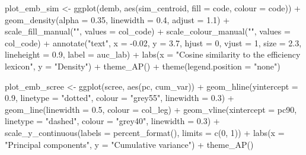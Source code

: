 \documentclass[
  11pt,
]{article}
\newenvironment{Shaded}{\begin{snugshade}}{\end{snugshade}}
\newcommand{\AttributeTok}[1]{\textcolor[rgb]{0.77,0.63,0.00}{#1}}
\newcommand{\DecValTok}[1]{\textcolor[rgb]{0.00,0.00,0.81}{#1}}
\newcommand{\FloatTok}[1]{\textcolor[rgb]{0.00,0.00,0.81}{#1}}
\newcommand{\FunctionTok}[1]{\textcolor[rgb]{0.00,0.00,0.00}{#1}}
\newcommand{\NormalTok}[1]{#1}
\newcommand{\OtherTok}[1]{\textcolor[rgb]{0.56,0.35,0.01}{#1}}
\newcommand{\SpecialCharTok}[1]{\textcolor[rgb]{0.00,0.00,0.00}{#1}}
\newcommand{\StringTok}[1]{\textcolor[rgb]{0.31,0.60,0.02}{#1}}
\begin{document}
\begin{Shaded}
\begin{Highlighting}[]
\NormalTok{plot\_emb\_sim }\OtherTok{\textless{}{-}} \FunctionTok{ggplot}\NormalTok{(demb, }\FunctionTok{aes}\NormalTok{(sim\_centroid, }\AttributeTok{fill =}\NormalTok{ code, }\AttributeTok{colour =}\NormalTok{ code)) }\SpecialCharTok{+}
  \FunctionTok{geom\_density}\NormalTok{(}\AttributeTok{alpha =} \FloatTok{0.35}\NormalTok{, }\AttributeTok{linewidth =} \FloatTok{0.4}\NormalTok{, }\AttributeTok{adjust =} \FloatTok{1.1}\NormalTok{) }\SpecialCharTok{+}
  \FunctionTok{scale\_fill\_manual}\NormalTok{(}\StringTok{""}\NormalTok{, }\AttributeTok{values =}\NormalTok{ col\_code) }\SpecialCharTok{+}
  \FunctionTok{scale\_colour\_manual}\NormalTok{(}\StringTok{""}\NormalTok{, }\AttributeTok{values =}\NormalTok{ col\_code) }\SpecialCharTok{+}
  \FunctionTok{annotate}\NormalTok{(}\StringTok{"text"}\NormalTok{, }\AttributeTok{x =} \SpecialCharTok{{-}}\FloatTok{0.02}\NormalTok{, }\AttributeTok{y =} \FloatTok{3.7}\NormalTok{, }\AttributeTok{hjust =} \DecValTok{0}\NormalTok{, }\AttributeTok{vjust =} \DecValTok{1}\NormalTok{, }\AttributeTok{size =} \FloatTok{2.3}\NormalTok{,}
           \AttributeTok{lineheight =} \FloatTok{0.9}\NormalTok{, }\AttributeTok{label =}\NormalTok{ auc\_lab) }\SpecialCharTok{+}
  \FunctionTok{labs}\NormalTok{(}\AttributeTok{x =} \StringTok{"Cosine similarity to the efficiency lexicon"}\NormalTok{, }\AttributeTok{y =} \StringTok{"Density"}\NormalTok{) }\SpecialCharTok{+}
  \FunctionTok{theme\_AP}\NormalTok{() }\SpecialCharTok{+}
  \FunctionTok{theme}\NormalTok{(}\AttributeTok{legend.position =} \StringTok{"none"}\NormalTok{)}

\NormalTok{plot\_emb\_scree }\OtherTok{\textless{}{-}} \FunctionTok{ggplot}\NormalTok{(scree, }\FunctionTok{aes}\NormalTok{(pc, cum\_var)) }\SpecialCharTok{+}
  \FunctionTok{geom\_hline}\NormalTok{(}\AttributeTok{yintercept =} \FloatTok{0.9}\NormalTok{, }\AttributeTok{linetype =} \StringTok{"dotted"}\NormalTok{, }\AttributeTok{colour =} \StringTok{"grey55"}\NormalTok{,}
             \AttributeTok{linewidth =} \FloatTok{0.3}\NormalTok{) }\SpecialCharTok{+}
  \FunctionTok{geom\_line}\NormalTok{(}\AttributeTok{linewidth =} \FloatTok{0.5}\NormalTok{, }\AttributeTok{colour =}\NormalTok{ col\_leg) }\SpecialCharTok{+}
  \FunctionTok{geom\_vline}\NormalTok{(}\AttributeTok{xintercept =}\NormalTok{ pc90, }\AttributeTok{linetype =} \StringTok{"dashed"}\NormalTok{, }\AttributeTok{colour =} \StringTok{"grey40"}\NormalTok{,}
             \AttributeTok{linewidth =} \FloatTok{0.3}\NormalTok{) }\SpecialCharTok{+}
  \FunctionTok{scale\_y\_continuous}\NormalTok{(}\AttributeTok{labels =} \FunctionTok{percent\_format}\NormalTok{(), }\AttributeTok{limits =} \FunctionTok{c}\NormalTok{(}\DecValTok{0}\NormalTok{, }\DecValTok{1}\NormalTok{)) }\SpecialCharTok{+}
  \FunctionTok{labs}\NormalTok{(}\AttributeTok{x =} \StringTok{"Principal components"}\NormalTok{, }\AttributeTok{y =} \StringTok{"Cumulative variance"}\NormalTok{) }\SpecialCharTok{+}
  \FunctionTok{theme\_AP}\NormalTok{()}


\end{Highlighting}
\end{Shaded}
\end{document}
